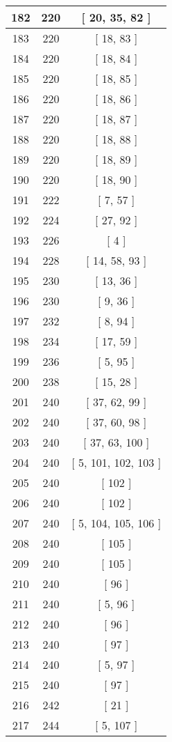 \begin{center}
\begin{longtable}[H]{|| c c c ||}
\hline
182 & 220 & [ 20, 35, 82 ] \\ 
\hline
183 & 220 & [ 18, 83 ] \\ 
\hline
184 & 220 & [ 18, 84 ] \\ 
\hline
185 & 220 & [ 18, 85 ] \\ 
\hline
186 & 220 & [ 18, 86 ] \\ 
\hline
187 & 220 & [ 18, 87 ] \\ 
\hline
188 & 220 & [ 18, 88 ] \\ 
\hline
189 & 220 & [ 18, 89 ] \\ 
\hline
190 & 220 & [ 18, 90 ] \\ 
\hline
191 & 222 & [ 7, 57 ] \\ 
\hline
192 & 224 & [ 27, 92 ] \\ 
\hline
193 & 226 & [ 4 ] \\ 
\hline
194 & 228 & [ 14, 58, 93 ] \\ 
\hline
195 & 230 & [ 13, 36 ] \\ 
\hline
196 & 230 & [ 9, 36 ] \\ 
\hline
197 & 232 & [ 8, 94 ] \\ 
\hline
198 & 234 & [ 17, 59 ] \\ 
\hline
199 & 236 & [ 5, 95 ] \\ 
\hline
200 & 238 & [ 15, 28 ] \\ 
\hline
201 & 240 & [ 37, 62, 99 ] \\ 
\hline
202 & 240 & [ 37, 60, 98 ] \\ 
\hline
203 & 240 & [ 37, 63, 100 ] \\ 
\hline
204 & 240 & [ 5, 101, 102, 103 ] \\ 
\hline
205 & 240 & [ 102 ] \\ 
\hline
206 & 240 & [ 102 ] \\ 
\hline
207 & 240 & [ 5, 104, 105, 106 ] \\ 
\hline
208 & 240 & [ 105 ] \\ 
\hline
209 & 240 & [ 105 ] \\ 
\hline
210 & 240 & [ 96 ] \\ 
\hline
211 & 240 & [ 5, 96 ] \\ 
\hline
212 & 240 & [ 96 ] \\ 
\hline
213 & 240 & [ 97 ] \\ 
\hline
214 & 240 & [ 5, 97 ] \\ 
\hline
215 & 240 & [ 97 ] \\ 
\hline
216 & 242 & [ 21 ] \\ 
\hline
217 & 244 & [ 5, 107 ] \\ 

\end{longtable}
\end{center}
